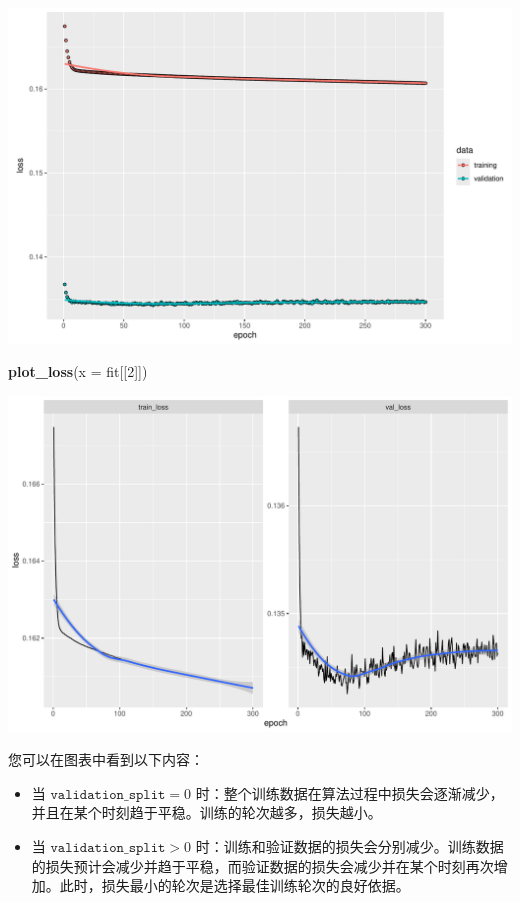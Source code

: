 \documentclass[
]{article}
\newenvironment{Shaded}{\begin{snugshade}}{\end{snugshade}}
\newcommand{\AttributeTok}[1]{\textcolor[rgb]{0.13,0.29,0.53}{#1}}
\newcommand{\DecValTok}[1]{\textcolor[rgb]{0.00,0.00,0.81}{#1}}
\newcommand{\FunctionTok}[1]{\textcolor[rgb]{0.13,0.29,0.53}{\textbf{#1}}}
\newcommand{\NormalTok}[1]{#1}
\begin{document}
\includegraphics{freMTPLfreq_fnn-zh-cn_files/figure-latex/unnamed-chunk-44-1.pdf}

\begin{Shaded}
\begin{Highlighting}[]
\FunctionTok{plot\_loss}\NormalTok{(}\AttributeTok{x =}\NormalTok{ fit[[}\DecValTok{2}\NormalTok{]])}
\end{Highlighting}
\end{Shaded}

\includegraphics{freMTPLfreq_fnn-zh-cn_files/figure-latex/unnamed-chunk-45-1.pdf}

您可以在图表中看到以下内容：

\begin{itemize}
\item
  当 \(\texttt{validation\_split}=0\)
  时：整个训练数据在算法过程中损失会逐渐减少，并且在某个时刻趋于平稳。训练的轮次越多，损失越小。
\item
  当 \(\texttt{validation\_split}>0\)
  时：训练和验证数据的损失会分别减少。训练数据的损失预计会减少并趋于平稳，而验证数据的损失会减少并在某个时刻再次增加。此时，损失最小的轮次是选择最佳训练轮次的良好依据。
\end{itemize}
\end{document}
